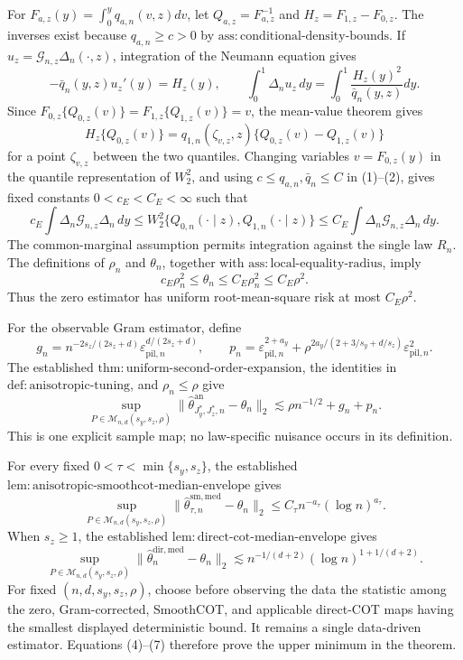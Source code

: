 For \(F_{a,z}(y)=\int_0^yq_{a,n}(v,z)dv\), let \(Q_{a,z}=F_{a,z}^{-1}\) and \(H_z=F_{1,z}-F_{0,z}\).  The inverses exist because \(q_{a,n}\ge c>0\) by \(\mathrm{ass{:}conditional\text{-}density\text{-}bounds}\).  If \(u_z=\mathcal G_{n,z}\Delta_n(\cdot,z)\), integration of the Neumann equation gives
\[
-\bar q_n(y,z)u_z'(y)=H_z(y),
\qquad
\int_0^1\Delta_nu_z\,dy
=\int_0^1\frac{H_z(y)^2}{\bar q_n(y,z)}dy. \tag{1}
\]
Since \(F_{0,z}\{Q_{0,z}(v)\}=F_{1,z}\{Q_{1,z}(v)\}=v\), the mean-value theorem gives
\[
H_z\{Q_{0,z}(v)\}
=q_{1,n}(\zeta_{v,z},z)\{Q_{0,z}(v)-Q_{1,z}(v)\} \tag{2}
\]
for a point \(\zeta_{v,z}\) between the two quantiles.  Changing variables \(v=F_{0,z}(y)\) in the quantile representation of \(W_2^2\), and using \(c\le q_{a,n},\bar q_n\le C\) in (1)--(2), gives fixed constants \(0<c_E<C_E<\infty\) such that
\[
c_E\int\Delta_n\mathcal G_{n,z}\Delta_n\,dy
\le W_2^2\{Q_{0,n}(\cdot\mid z),Q_{1,n}(\cdot\mid z)\}
\le C_E\int\Delta_n\mathcal G_{n,z}\Delta_n\,dy. \tag{3}
\]
The common-marginal assumption permits integration against the single law \(R_n\).  The definitions of \(\rho_n\) and \(\theta_n\), together with \(\mathrm{ass{:}local\text{-}equality\text{-}radius}\), imply
\[
c_E\rho_n^2\le\theta_n\le C_E\rho_n^2\le C_E\rho^2. \tag{4}
\]
Thus the zero estimator has uniform root-mean-square risk at most \(C_E\rho^2\).

For the observable Gram estimator, define
\[
g_n=n^{-2s_z/(2s_z+d)}\varepsilon_{\mathrm{pil},n}^{d/(2s_z+d)},
\qquad
p_n=\varepsilon_{\mathrm{pil},n}^{2+a_y}
+\rho^{2a_y/(2+3/s_y+d/s_z)}\varepsilon_{\mathrm{pil},n}^2.
\]
The established \(\mathrm{thm{:}uniform\text{-}second\text{-}order\text{-}expansion}\), the identities in \(\mathrm{def{:}anisotropic\text{-}tuning}\), and \(\rho_n\le\rho\) give
\[
\sup_{P\in\mathcal M_{n,d}(s_y,s_z,\rho)}
\|\widehat\theta^{\mathrm{an}}_{J_y^*,J_z^*,n}-\theta_n\|_2
\lesssim\rho n^{-1/2}+g_n+p_n. \tag{5}
\]
This is one explicit sample map; no law-specific nuisance occurs in its definition.

For every fixed \(0<\tau<\min\{s_y,s_z\}\), the established \(\mathrm{lem{:}anisotropic\text{-}smoothcot\text{-}median\text{-}envelope}\) gives
\[
\sup_{P\in\mathcal M_{n,d}(s_y,s_z,\rho)}
\|\widehat\theta^{\mathrm{sm,med}}_{\tau,n}-\theta_n\|_2
\le C_\tau n^{-a_\tau}(\log n)^{a_\tau}. \tag{6}
\]
When \(s_z\ge1\), the established \(\mathrm{lem{:}direct\text{-}cot\text{-}median\text{-}envelope}\) gives
\[
\sup_{P\in\mathcal M_{n,d}(s_y,s_z,\rho)}
\|\widehat\theta_n^{\mathrm{dir,med}}-\theta_n\|_2
\lesssim n^{-1/(d+2)}(\log n)^{1+1/(d+2)}. \tag{7}
\]
For fixed \((n,d,s_y,s_z,\rho)\), choose before observing the data the statistic among the zero, Gram-corrected, SmoothCOT, and applicable direct-COT maps having the smallest displayed deterministic bound.  It remains a single data-driven estimator.  Equations (4)--(7) therefore prove the upper minimum in the theorem.

